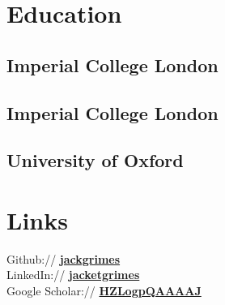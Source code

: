 \documentclass[]{cv}
\begin{document}
%
%
\lastupdated

%
%

%
%

\begin{minipage}[t]{0.33\textwidth} 


\section{Education} 

\subsection{Imperial College London}
\sectionsep

\subsection{Imperial College London}
\sectionsep

\subsection{University of Oxford}
\sectionsep


\section{Links} 
Github:// \href{https://github.com/jackgrimes}{\bf jackgrimes} \\
LinkedIn://  \href{https://www.linkedin.com/in/jacketgrimes}{\bf jacketgrimes} \\
Google Scholar://  \href{https://scholar.google.co.uk/citations?hl=en&user=HZLogpQAAAAJ}{\bf HZLogpQAAAAJ} \\
\sectionsep


\end{minipage}
\end{document}
